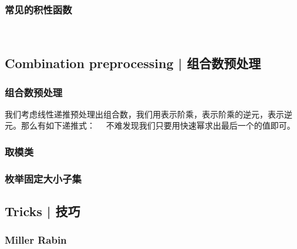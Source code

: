 \documentclass[8pt,a4paper]{article}
\newcommand{\code}[1]{
    
}
\newcommand{\txt}[1]{\par\noindent\footnotesize #1}
\newcommand{\inlineformula}[1]{\ensuremath{}}
\begin{document}
\begin{multicols}{2}
        \subsubsection{常见的积性函数}
            \txt{\inlineformula{./assets/formulas_tex/formula_204.tex}
\inlineformula{./assets/formulas_tex/formula_205.tex}
\inlineformula{./assets/formulas_tex/formula_206.tex}
\inlineformula{./assets/formulas_tex/formula_207.tex}
\inlineformula{./assets/formulas_tex/formula_208.tex}
\inlineformula{./assets/formulas_tex/formula_209.tex}
\inlineformula{./assets/formulas_tex/formula_210.tex}}

    \subsection{Combination preprocessing | 组合数预处理}
        \subsubsection{组合数预处理}
            \txt{我们考虑\inlineformula{./assets/formulas_tex/formula_211.tex}线性递推预处理出组合数，我们用\inlineformula{./assets/formulas_tex/formula_212.tex}表示阶乘，\inlineformula{./assets/formulas_tex/formula_213.tex}表示阶乘的逆元，\inlineformula{./assets/formulas_tex/formula_214.tex}表示逆元。那么有如下递推式：
\inlineformula{./assets/formulas_tex/formula_215.tex}
\inlineformula{./assets/formulas_tex/formula_216.tex}
\inlineformula{./assets/formulas_tex/formula_217.tex}
不难发现我们只要用快速幂求出最后一个\inlineformula{./assets/formulas_tex/formula_218.tex}的值即可。}
            \code{src/number_theory/组合数预处理_7.cpp}
        \subsubsection{取模类}
            \code{src/number_theory/组合数预处理_2_5.cpp}
        \subsubsection{枚举固定大小子集}
            \code{src/number_theory/组合数预处理_3_5.cpp}

    \subsection{Tricks | 技巧}
        \subsubsection{Miller Rabin}
            \code{src/number_theory/技巧_Trick_2_5.cpp}

\end{multicols}
\end{document}
